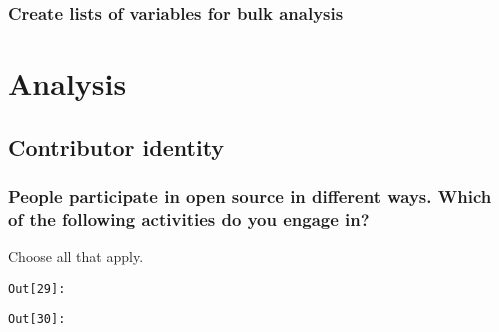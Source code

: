 \documentclass[11pt]{article}
\begin{document}
    

    \subsubsection{Create lists of variables for bulk
analysis}\label{create-lists-of-variables-for-bulk-analysis}







    \section{Analysis}\label{analysis}


    \subsection{Contributor identity}\label{contributor-identity}

    \subsubsection{People participate in open source in different ways.
Which of the following activities do you engage
in?}\label{people-participate-in-open-source-in-different-ways.-which-of-the-following-activities-do-you-engage-in}

Choose all that apply.

\texttt{\color{outcolor}Out[{\color{outcolor}29}]:}
    

    

\texttt{\color{outcolor}Out[{\color{outcolor}30}]:}
    
\end{document}
